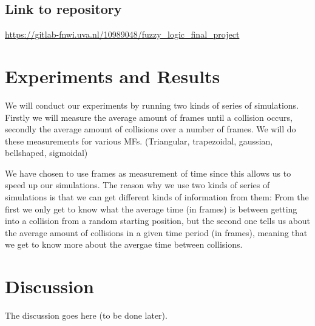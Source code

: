 \documentclass[conference]{IEEEtran}
\begin{document}
\subsection{Link to repository}
\url{
https://gitlab-fnwi.uva.nl/10989048/fuzzy_logic_final_project
}

\section{Experiments and Results}
We will conduct our experiments by running two kinds of series of simulations. Firstly we will measure the average amount of frames until a collision occurs, secondly the average amount of collisions over a number of frames. We will do these measurements for various MFs. (Triangular, trapezoidal, gaussian, bellshaped, sigmoidal)

We have chosen to use frames as measurement of time since this allows us to speed up our simulations. The reason why we use two kinds of series of simulations is that we can get different kinds of information from them: From the first we only get to know what the average time (in frames) is between getting into a collision from a random starting position, but the second one tells us about the average amount of collisions in a given time period (in frames), meaning that we get to know more about the avergae time between collisions.

\section{Discussion}
The discussion goes here (to be done later).








\nocite{*}




\end{document}

